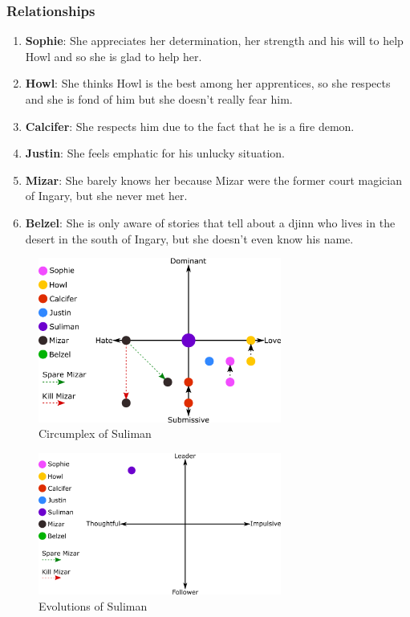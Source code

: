 \subsubsection*{Relationships}
\begin{enumerate}
\item \textbf{Sophie}: She appreciates her determination, her strength and his will to help Howl and so she is glad to help her.
\item \textbf{Howl}: She thinks Howl is the best among her apprentices, so she respects and she is fond of him but she doesn't really fear him.
\item \textbf{Calcifer}: She respects him due to the fact that he is a fire demon.
\item \textbf{Justin}: She feels emphatic for his unlucky situation.
\item \textbf{Mizar}: She barely knows her because Mizar were the former court magician of Ingary, but she never met her.
\item \textbf{Belzel}: She is only aware of stories that tell about a djinn who lives in the desert in the south of Ingary, but she doesn't even know his name.
\end{enumerate}

\begin{figure}[H]
  \centering
  \includegraphics[width=8cm]{Images/SVG/Exported/Circumplexes/sulimanCircumplex}
  \caption{Circumplex of Suliman}
\end{figure}

\begin{figure}[H]
  \centering
   \includegraphics[width=8cm]{Images/SVG/Exported/Evolutions/sulimanEvolution}
  \caption{Evolutions of Suliman}
\end{figure}

